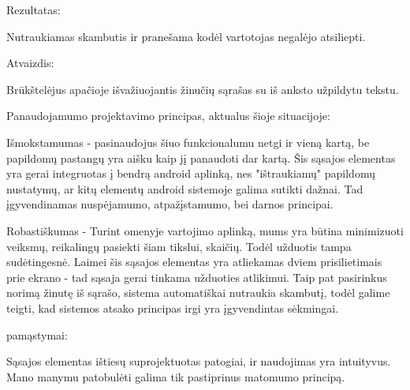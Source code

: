 ﻿\documentclass[a4paper, 12pt]{article}
\begin{document}
		Rezultatas:

		Nutraukiamas skambutis ir pranešama kodėl vartotojas negalėjo atsiliepti.\newline

		Atvaizdis:

		Brūkštelėjus apačioje išvažiuojantis žinučių sąrašas su iš anksto užpildytu tekstu.\newline

		Panaudojamumo projektavimo principas, aktualus šioje situacijoje:

		Išmokstamumas - pasinaudojus šiuo funkcionalumu netgi ir vieną kartą,
		be papildomų pastangų yra aišku kaip jį panaudoti dar kartą. Šis sąsajos
		elementas yra gerai integruotas į bendrą android aplinką, nes "ištraukiamų"
		papildomų nustatymų, ar kitų elementų android sistemoje galima sutikti dažnai.
		Tad įgyvendinamas nuspėjamumo, atpažįstamumo, bei darnos principai.

		Robastiškumas - Turint omenyje vartojimo aplinką, mums yra būtina minimizuoti
		veiksmų, reikalingų pasiekti šiam tikslui, skaičių. Todėl užduotis tampa
		sudėtingesnė. Laimei šis sąsajos elementas yra atliekamas dviem prisilietimais
		prie ekrano - tad sąsaja gerai tinkama užduoties atlikimui. Taip pat pasirinkus
		norimą žinutę iš sąrašo, sistema automatiškai nutraukia skambutį, todėl galime
		teigti, kad sistemos atsako principas irgi yra įgyvendintas sėkmingai.

		pamąstymai:

		Sąsajos elementas ištiesų suprojektuotas patogiai, ir naudojimas yra intuityvus.
		Mano manymu patobulėti galima tik pastiprinus matomumo principą. 
\end{document}
